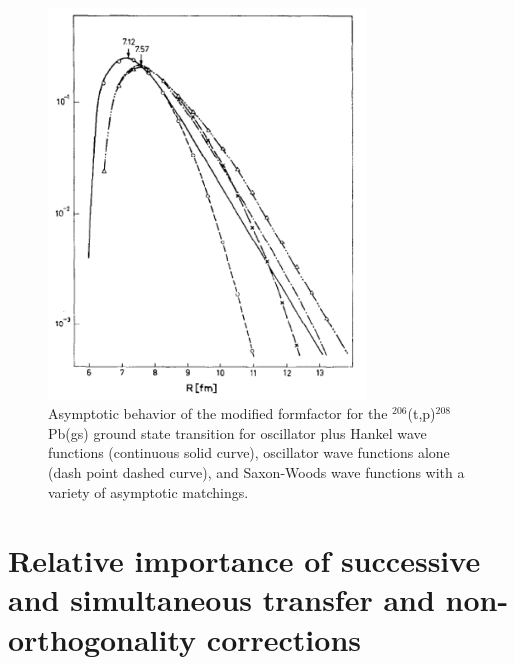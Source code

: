  \begin{figure}[h!]
 	\begin{center}
\includegraphics*[width=0.75\textwidth]{C7/figs_C7/figC7B4}
\end{center}\caption{Asymptotic behavior of the modified formfactor for the $^{206}$(t,p)$^{208}$Pb(gs) ground state transition for oscillator plus Hankel wave functions (continuous solid curve), oscillator wave functions alone (dash point dashed curve), and Saxon-Woods wave functions with a variety of asymptotic matchings.}\label{figC7B4}
\end{figure}
\section[Successive, simultaneous, non-orthogonality]{Relative importance of successive and simultaneous transfer and non-orthogonality corrections}\label{C7AppC}

